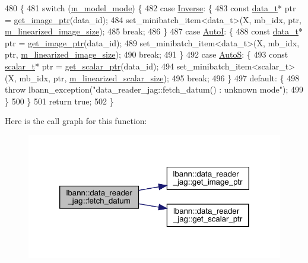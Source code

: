 \begin{DoxyCode}
480                                                                           \{
481   \textcolor{keywordflow}{switch} (\hyperlink{classlbann_1_1data__reader__jag_a877eb1f0eb2afccd73cd7d69407ff6e2}{m\_model\_mode}) \{
482     \textcolor{keywordflow}{case} \hyperlink{classlbann_1_1data__reader__jag_a114c369c8604df385cf7a3ec20c9739ba2d3bba9f202270762169c1c01d2fb7a4}{Inverse}: \{
483       \textcolor{keyword}{const} \hyperlink{classlbann_1_1data__reader__jag_a7377d6c02c455f019a378489b9b8eab4}{data\_t}* ptr = \hyperlink{classlbann_1_1data__reader__jag_aab51581a1b8175bf5da1b74454ef7701}{get\_image\_ptr}(data\_id);
484       set\_minibatch\_item<data\_t>(X, mb\_idx, ptr, \hyperlink{classlbann_1_1data__reader__jag_a7c2aa5f489e7c7a3236c1f6c4a760048}{m\_linearized\_image\_size});
485       \textcolor{keywordflow}{break};
486     \}
487     \textcolor{keywordflow}{case} \hyperlink{classlbann_1_1data__reader__jag_a114c369c8604df385cf7a3ec20c9739bae9c49fc4443020e18086fc83ce0b369b}{AutoI}: \{
488       \textcolor{keyword}{const} \hyperlink{classlbann_1_1data__reader__jag_a7377d6c02c455f019a378489b9b8eab4}{data\_t}* ptr = \hyperlink{classlbann_1_1data__reader__jag_aab51581a1b8175bf5da1b74454ef7701}{get\_image\_ptr}(data\_id);
489       set\_minibatch\_item<data\_t>(X, mb\_idx, ptr, \hyperlink{classlbann_1_1data__reader__jag_a7c2aa5f489e7c7a3236c1f6c4a760048}{m\_linearized\_image\_size});
490       \textcolor{keywordflow}{break};
491     \}
492     \textcolor{keywordflow}{case} \hyperlink{classlbann_1_1data__reader__jag_a114c369c8604df385cf7a3ec20c9739baab2b8e8bef02dfc8ffaae80bdd0a7fd4}{AutoS}: \{
493       \textcolor{keyword}{const} \hyperlink{classlbann_1_1data__reader__jag_aa2e01bc071588b9c1a583e5a752abcc6}{scalar\_t}* ptr = \hyperlink{classlbann_1_1data__reader__jag_abaa3c00c30ebaa54d395c93f0225570c}{get\_scalar\_ptr}(data\_id);
494       set\_minibatch\_item<scalar\_t>(X, mb\_idx, ptr, \hyperlink{classlbann_1_1data__reader__jag_a856b4b9cdf9d8569e5fef1d5d996870d}{m\_linearized\_scalar\_size});
495       \textcolor{keywordflow}{break};
496     \}
497     \textcolor{keywordflow}{default}: \{
498       \textcolor{keywordflow}{throw} lbann\_exception(\textcolor{stringliteral}{"data\_reader\_jag::fetch\_datum() : unknown mode"});
499     \}
500   \}
501   \textcolor{keywordflow}{return} \textcolor{keyword}{true};
502 \}
\end{DoxyCode}
Here is the call graph for this function\+:\nopagebreak
\begin{figure}[H]
\begin{center}
\leavevmode
\includegraphics[width=320pt]{classlbann_1_1data__reader__jag_a3b22313694b8ff258486491775100d89_cgraph}
\end{center}
\end{figure}
